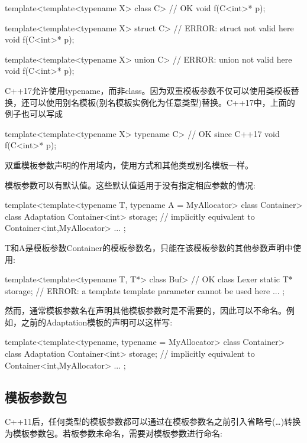 \begin{cpp}
template<template<typename X> class C> // OK
void f(C<int>* p);

template<template<typename X> struct C> // ERROR: struct not valid here
void f(C<int>* p);

template<template<typename X> union C> // ERROR: union not valid here
void f(C<int>* p);
\end{cpp}

C++17允许使用typename，而非class。因为双重模板参数不仅可以使用类模板替换，还可以使用别名模板(别名模板实例化为任意类型)替换。C++17中，上面的例子也可以写成

\begin{cpp}
template<template<typename X> typename C> // OK since C++17
void f(C<int>* p);
\end{cpp}

双重模板参数声明的作用域内，使用方式和其他类或别名模板一样。

模板参数可以有默认值。这些默认值适用于没有指定相应参数的情况:

\begin{cpp}
template<template<typename T,
				  typename A = MyAllocator> class Container>
class Adaptation {
	Container<int> storage; // implicitly equivalent to Container<int,MyAllocator>
	...
};
\end{cpp}

T和A是模板参数Container的模板参数名，只能在该模板参数的其他参数声明中使用:

\begin{cpp}
template<template<typename T, T*> class Buf> // OK
class Lexer {
	static T* storage; // ERROR: a template template parameter cannot be used here
	...
};
\end{cpp}

然而，通常模板参数名在声明其他模板参数时是不需要的，因此可以不命名。例如，之前的Adaptation模板的声明可以这样写:

\begin{cpp}
template<template<typename,
				  typename = MyAllocator> class Container>
class Adaptation {
	Container<int> storage; // implicitly equivalent to Container<int,MyAllocator>
	...
};
\end{cpp}

\subsection{模板参数包}

C++11后，任何类型的模板参数都可以通过在模板参数名之前引入省略号(…)转换为模板参数包。若板参数未命名，需要对模板参数进行命名:

